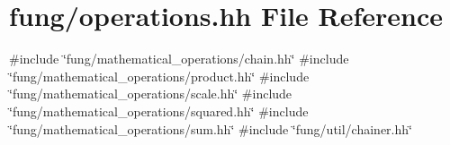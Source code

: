 \hypertarget{operations_8hh}{\section{fung/operations.hh \-File \-Reference}
\label{operations_8hh}
}
{\ttfamily \#include \char`\"{}fung/mathematical\-\_\-operations/chain.\-hh\char`\"{}}\*
{\ttfamily \#include \char`\"{}fung/mathematical\-\_\-operations/product.\-hh\char`\"{}}\*
{\ttfamily \#include \char`\"{}fung/mathematical\-\_\-operations/scale.\-hh\char`\"{}}\*
{\ttfamily \#include \char`\"{}fung/mathematical\-\_\-operations/squared.\-hh\char`\"{}}\*
{\ttfamily \#include \char`\"{}fung/mathematical\-\_\-operations/sum.\-hh\char`\"{}}\*
{\ttfamily \#include \char`\"{}fung/util/chainer.\-hh\char`\"{}}\*

